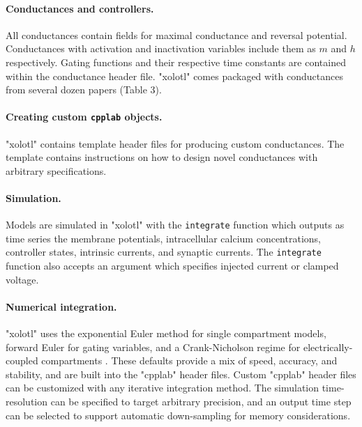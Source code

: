 \documentclass{frontiersSCNS} %
\begin{document}
\paragraph{Conductances and controllers.}

All conductances contain fields for maximal conductance and reversal potential. Conductances with activation and inactivation variables include them as $m$ and $h$ respectively. Gating functions and their respective time constants are contained within the conductance header file. "xolotl" comes packaged with conductances from several dozen papers (Table 3).

\paragraph{Creating custom \texttt{cpplab} objects.}

"xolotl" contains template header files for producing custom conductances. The template contains instructions on how to design novel conductances with arbitrary specifications.

\paragraph{Simulation.}

Models are simulated in "xolotl" with the \texttt{integrate} function which outputs as time series the membrane potentials, intracellular calcium concentrations, controller states, intrinsic currents, and synaptic currents. The \texttt{integrate} function also accepts an argument which specifies injected current or clamped voltage. 

\paragraph{Numerical integration.}
"xolotl" uses the exponential Euler method for single compartment models, forward Euler for gating variables, and a Crank-Nicholson regime for electrically-coupled compartments \autocite{ohErrorAnalysisSpecialized2006, dayanTheoreticalNeuroscience2001, butcherNumericalDifferentialEquation2016}. These defaults provide a mix of speed, accuracy, and stability, and are built into the "cpplab" header files. Custom "cpplab" header files can be customized with any iterative integration method. The simulation time-resolution can be specified to target arbitrary precision, and an output time step can be selected to support automatic down-sampling for memory considerations.
\end{document}
